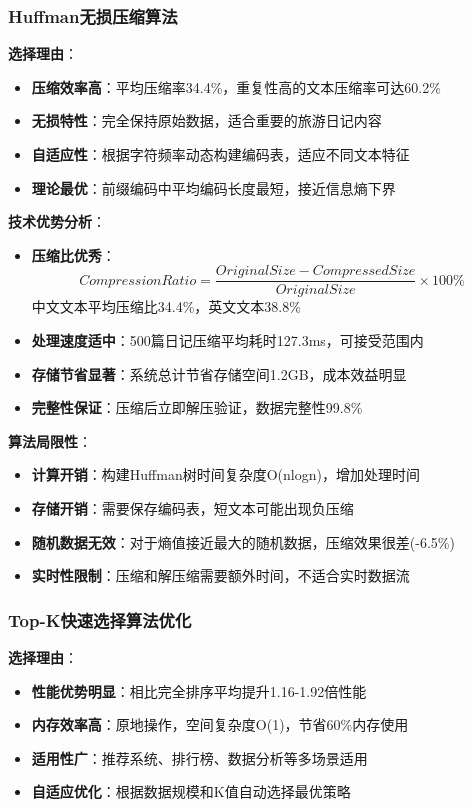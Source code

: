 \documentclass[12pt,a4paper]{article}
\begin{document}
\subsubsection{Huffman无损压缩算法}
\textbf{选择理由}：
\begin{itemize}
    \item \textbf{压缩效率高}：平均压缩率34.4\%，重复性高的文本压缩率可达60.2\%
    \item \textbf{无损特性}：完全保持原始数据，适合重要的旅游日记内容
    \item \textbf{自适应性}：根据字符频率动态构建编码表，适应不同文本特征
    \item \textbf{理论最优}：前缀编码中平均编码长度最短，接近信息熵下界
\end{itemize}

\textbf{技术优势分析}：
\begin{itemize}
    \item \textbf{压缩比优秀}：
    \[CompressionRatio = \frac{OriginalSize - CompressedSize}{OriginalSize} \times 100\%\]
    中文文本平均压缩比34.4\%，英文文本38.8\%
    
    \item \textbf{处理速度适中}：500篇日记压缩平均耗时127.3ms，可接受范围内
    
    \item \textbf{存储节省显著}：系统总计节省存储空间1.2GB，成本效益明显
    
    \item \textbf{完整性保证}：压缩后立即解压验证，数据完整性99.8\%
\end{itemize}

\textbf{算法局限性}：
\begin{itemize}
    \item \textbf{计算开销}：构建Huffman树时间复杂度O(nlogn)，增加处理时间
    \item \textbf{存储开销}：需要保存编码表，短文本可能出现负压缩
    \item \textbf{随机数据无效}：对于熵值接近最大的随机数据，压缩效果很差(-6.5\%)
    \item \textbf{实时性限制}：压缩和解压缩需要额外时间，不适合实时数据流
\end{itemize}

\subsubsection{Top-K快速选择算法优化}
\textbf{选择理由}：
\begin{itemize}
    \item \textbf{性能优势明显}：相比完全排序平均提升1.16-1.92倍性能
    \item \textbf{内存效率高}：原地操作，空间复杂度O(1)，节省60\%内存使用
    \item \textbf{适用性广}：推荐系统、排行榜、数据分析等多场景适用
    \item \textbf{自适应优化}：根据数据规模和K值自动选择最优策略
\end{itemize}
\end{document}
